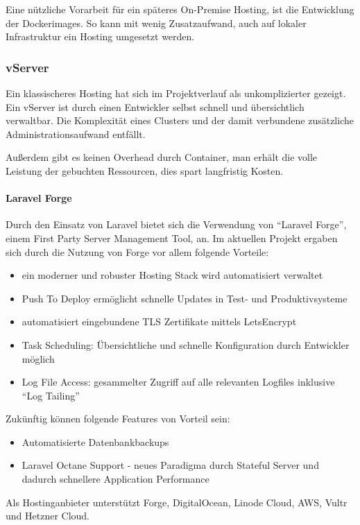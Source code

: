 Eine nützliche Vorarbeit für ein späteres On-Premise Hosting, ist die Entwicklung der Dockerimages.
So kann mit wenig Zusatzaufwand, auch auf lokaler Infrastruktur ein Hosting umgesetzt werden.
\newpage

\subsubsection{vServer}
Ein klassischeres Hosting hat sich im Projektverlauf als unkomplizierter gezeigt.
Ein vServer ist durch einen Entwickler selbst schnell und übersichtlich verwaltbar.
Die Komplexität eines Clusters und der damit verbundene zusätzliche Administrationsaufwand entfällt.

Außerdem gibt es keinen Overhead durch Container, man erhält die volle Leistung der gebuchten Ressourcen, dies spart langfristig Kosten.

\paragraph{Laravel Forge}
Durch den Einsatz von Laravel bietet sich die Verwendung von \enquote{Laravel Forge}\cite{laravel-forge}, einem First Party Server Management Tool, an.
Im aktuellen Projekt ergaben sich durch die Nutzung von Forge vor allem folgende Vorteile:
\begin{itemize}
    \item ein moderner und robuster Hosting Stack wird automatisiert verwaltet
    \item Push To Deploy ermöglicht schnelle Updates in Test- und Produktivsysteme
    \item automatisiert eingebundene TLS Zertifikate mittels LetsEncrypt
    \item Task Scheduling: Übersichtliche und schnelle Konfiguration durch Entwickler möglich
    \item Log File Access: gesammelter Zugriff auf alle relevanten Logfiles inklusive \enquote{Log Tailing}
\end{itemize}

Zukünftig können folgende Features von Vorteil sein:
\begin{itemize}
    \item Automatisierte Datenbankbackups
    \item Laravel Octane Support - neues Paradigma durch Stateful Server und dadurch schnellere Application Performance\cite{laravel-octane}
\end{itemize}

Als Hostinganbieter unterstützt Forge, DigitalOcean, Linode Cloud, AWS, Vultr und Hetzner Cloud.


